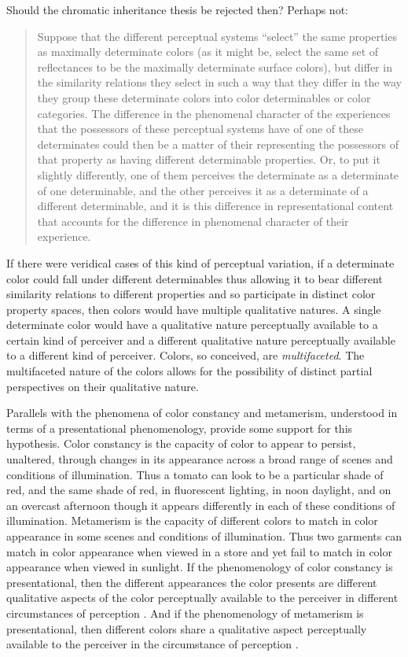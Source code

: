 \documentclass[12pt]{article}
\begin{document}
Should the chromatic inheritance thesis be rejected then? Perhaps not: 
\begin{quote}
	Suppose that the different perceptual systems ``select'' the same properties as maximally determinate colors (as it might be, select the same set of reflectances to be the maximally determinate surface colors), but differ in the similarity relations they select in such a way that they differ in the way they group these determinate colors into color determinables or color categories. The difference in the phenomenal character of the experiences that the possessors of these perceptual systems have of one of these determinates could then be a matter of their representing the possessors of that property as having different determinable properties. Or, to put it slightly differently, one of them perceives the determinate as a determinate of one determinable, and the other perceives it as a determinate of a different determinable, and it is this difference in representational content that accounts for the difference in phenomenal character of their experience. \citep[266]{Shoemaker:wk} 
\end{quote}
If there were veridical cases of this kind of perceptual variation, if a determinate color could fall under different determinables thus allowing it to bear different similarity relations to different properties and so participate in distinct color property spaces, then colors would have multiple qualitative natures. A single determinate color would have a qualitative nature perceptually available to a certain kind of perceiver and a different qualitative nature perceptually available to a different kind of perceiver.  Colors, so conceived, are \emph{multifaceted}. The multifaceted nature of the colors allows for the possibility of distinct partial perspectives on their qualitative nature.

Parallels with the phenomena of color constancy and metamerism, understood in terms of a presentational phenomenology, provide some support for this hypothesis. Color constancy is the capacity of color to appear to persist, unaltered, through changes in its appearance across a broad range of scenes and conditions of illumination. Thus a tomato can look to be a particular shade of red, and the same shade of red, in fluorescent lighting, in noon daylight, and on an overcast afternoon though it appears differently in each of these conditions of illumination. Metamerism is the capacity of different colors to match in color appearance in some scenes and conditions of illumination. Thus two garments can match in color appearance when viewed in a store and yet fail to match in color appearance when viewed in sunlight. If the phenomenology of color constancy is presentational, then the different appearances the color presents are different qualitative aspects of the color perceptually available to the perceiver in different circumstances of perception \citep[see][for a defense of this]{Hilbert:2007qy,Kalderon:2008fk}. And if the phenomenology of metamerism is presentational, then different colors share a qualitative aspect perceptually available to the perceiver in the circumstance of perception \citep[see][for a defense of this]{Kalderon:2008fk}.
\end{document}
